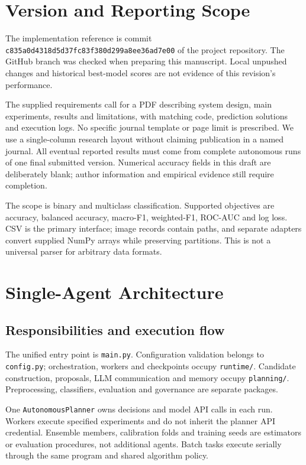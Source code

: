 \documentclass[11pt,a4paper]{article}
\newcommand{\code}[1]{\texttt{\small #1}}
\begin{document}
\section{Version and Reporting Scope}
The implementation reference is commit \code{c835a0d4318d5d37fc83f380d299a8ee36ad7e00} of the project repository. The GitHub branch was checked when preparing this manuscript. Local unpushed changes and historical best-model scores are not evidence of this revision's performance.

The supplied requirements call for a PDF describing system design, main experiments, results and limitations, with matching code, prediction solutions and execution logs. No specific journal template or page limit is prescribed. We use a single-column research layout without claiming publication in a named journal. All eventual reported results must come from complete autonomous runs of one final submitted version. Numerical accuracy fields in this draft are deliberately blank; author information and empirical evidence still require completion.

The scope is binary and multiclass classification. Supported objectives are accuracy, balanced accuracy, macro-F1, weighted-F1, ROC-AUC and log loss. CSV is the primary interface; image records contain paths, and separate adapters convert supplied NumPy arrays while preserving partitions. This is not a universal parser for arbitrary data formats.

\section{Single-Agent Architecture}
\subsection{Responsibilities and execution flow}
The unified entry point is \code{main.py}. Configuration validation belongs to \code{config.py}; orchestration, workers and checkpoints occupy \code{runtime/}. Candidate construction, proposals, LLM communication and memory occupy \code{planning/}. Preprocessing, classifiers, evaluation and governance are separate packages.

One \code{AutonomousPlanner} owns decisions and model API calls in each run. Workers execute specified experiments and do not inherit the planner API credential. Ensemble members, calibration folds and training seeds are estimators or evaluation procedures, not additional agents. Batch tasks execute serially through the same program and shared algorithm policy.
\end{document}
